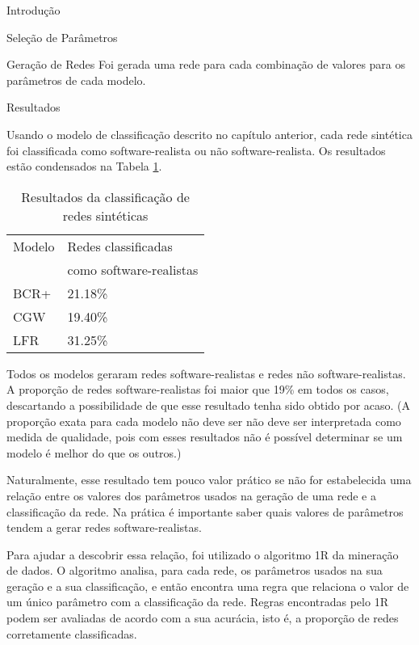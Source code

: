 \begin{section}{Introdução}
\begin{subsection}{Seleção de Parâmetros}
\end{subsection}

\begin{section}{Geração de Redes}
	Foi gerada uma rede para cada combinação de valores para os parâmetros de cada modelo. %
\end{section}

\begin{subsection}{Resultados}

Usando o modelo de classificação descrito no capítulo anterior, cada rede sintética foi classificada como software-realista ou não software-realista. Os resultados estão condensados na Tabela \ref{tab:results}.

\begin{table}
\caption{Resultados da classificação de redes sintéticas}
\centering
\begin{tabular}{|l|l|}
\hline
Modelo & Redes classificadas \\ & como software-realistas \\
\hline 
\hline
BCR+ & 21.18\% \\ %
\hline
CGW  & 19.40\% \\  %
\hline
LFR  & 31.25\% \\ %
\hline
\end{tabular}
\label{tab:results}
\end{table}

Todos os modelos geraram redes software-realistas e redes não software-realistas. A proporção de redes software-realistas foi maior que 19\% em todos os casos, descartando a possibilidade de que esse resultado tenha sido obtido por acaso. (A proporção exata para cada modelo não deve ser não deve ser interpretada como medida de qualidade, pois com esses resultados não é possível determinar se um modelo é melhor do que os outros.)

Naturalmente, esse resultado tem pouco valor prático se não for estabelecida uma relação entre os valores dos parâmetros usados na geração de uma rede e a classificação da rede. Na prática é importante saber quais valores de parâmetros tendem a gerar redes software-realistas.

Para ajudar a descobrir essa relação, foi utilizado o algoritmo 1R \cite{OneR} da mineração de dados. O algoritmo analisa, para cada rede, os parâmetros usados na sua geração e a sua classificação, e então encontra uma regra que relaciona o valor de um único parâmetro com a classificação da rede. Regras encontradas pelo 1R podem ser avaliadas de acordo com a sua acurácia, isto é, a proporção de redes corretamente classificadas.


\end{subsection}
\end{section}
